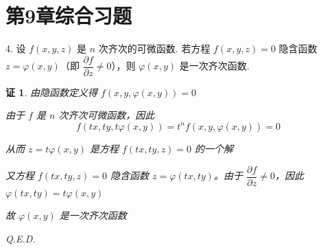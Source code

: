 \documentclass[a4paper,12pt]{article}
\newtheorem*{pf}{证}
\begin{document}
\section*{第9章综合习题}

4. 设 $f(x,y,z)$ 是 $n$ 次齐次的可微函数. 若方程 $f(x,y,z)=0$ 隐含函数 $z=\varphi(x,y)$（即 $\dfrac{\partial f}{\partial z} \neq 0$），则 $\varphi(x,y)$ 是一次齐次函数.
\begin{pf}
    由隐函数定义得 $f(x,y,\varphi(x,y))=0$

    由于 $f$ 是 $n$ 次齐次可微函数，因此
    $$
        f(tx,ty,t\varphi(x,y))=t^nf(x,y,\varphi(x,y))=0
    $$

    从而 $z=t\varphi(x,y)$ 是方程 $f(tx,ty,z)=0$ 的一个解

    又方程 $f(tx,ty,z)=0$ 隐含函数 $z=\varphi(tx,ty)$。由于 $\dfrac{\partial f}{\partial z}\neq 0$，因此 $\varphi(tx,ty)=t\varphi(x,y)$

    故 $\varphi(x,y)$ 是一次齐次函数

    Q.E.D.
\end{pf}
\end{document}
